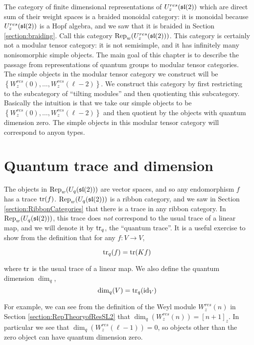 \label{chapter:MTC}
The category of finite dimensional representations of $U_z^{res}(\mathfrak{sl}(2))$
which are direct sum of their weight spaces is a braided monoidal category: it
is monoidal because $U_z^{res}(\mathfrak{sl}(2))$ is a Hopf algebra, and we saw that it
is braided in Section \ref{section:braiding}. Call this category
$\operatorname{Rep}_w(U_z^{res}(\mathfrak{sl}(2)))$. This category is certainly not a modular tensor
category: it is not semisimple, and it has infinitely many nonisomorphic simple
objects. The main goal of this chapter is to describe the passage from
representations of quantum groups to modular tensor categories.  The simple
objects in the modular tensor category we construct will be $\left\{
W_z^{res}(0), \ldots, W_z^{res}(\ell-2) \right\}$. We construct this category
by first restricting to the subcategory of ``tilting modules'' and then
quotienting this subcategory. Basically the intuition is that we take our
simple objects to be $\left\{ W_z^{res}(0), \ldots, W_z^{res}(\ell-2) \right\}$
and then quotient by the objects with quantum dimension zero.  The simple
objects in this modular tensor category will correspond to anyon types.



\section{Quantum trace and dimension}

The objects in $\operatorname{Rep}_w(U_q(\mathfrak{sl}(2)))$ are vector spaces, and so any
endomorphism $f$ has a trace $\operatorname{tr}(f)$. $\operatorname{Rep}_w(U_q(\mathfrak{sl}(2)))$ is a ribbon
category, and we saw in Section \ref{section:RibbonCategories} that there is a
trace in any ribbon category. In $\operatorname{Rep}_w(U_q(\mathfrak{sl}(2)))$, this trace does
\emph{not} correspond to the usual trace of a linear map, and we will denote it
by $\operatorname{tr}_q$, the ``quantum trace''. It is a useful exercise to show from the
definition that for any $f: V \to V$,

\begin{equation}
\operatorname{tr}_q(f) = \operatorname{tr}(Kf)
\end{equation}

where $\operatorname{tr}$ is the usual trace of a linear map. We also define the quantum
dimension $\dim_q$,
\begin{equation}
\dim_q(V) = \operatorname{tr}_q(\operatorname{id}_V)
\end{equation}

For example, we can see from the definition of the Weyl module $W_z^{res}(n)$
in Section \ref{section:RepTheoryofResSL2} that $\dim_q(W_z^{res}(n)) = [n+1]_z$. In
particular we see that $\dim_q(W_z^{res}(\ell - 1)) = 0$, so objects other than
the zero object can have quantum dimension zero. 

